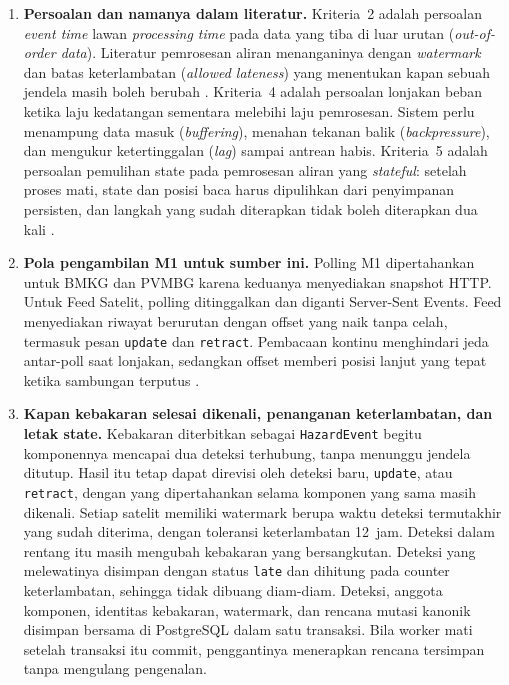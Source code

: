 \begin{enumerate}
\item \textbf{Persoalan dan namanya dalam literatur.} Kriteria~2 adalah persoalan \emph{event time} lawan \emph{processing time} pada data yang tiba di luar urutan (\emph{out-of-order data}). Literatur pemrosesan aliran menanganinya dengan \emph{watermark} dan batas keterlambatan (\emph{allowed lateness}) yang menentukan kapan sebuah jendela masih boleh berubah \cite{akidau2015}. Kriteria~4 adalah persoalan lonjakan beban ketika laju kedatangan sementara melebihi laju pemrosesan. Sistem perlu menampung data masuk (\emph{buffering}), menahan tekanan balik (\emph{backpressure}), dan mengukur ketertinggalan (\emph{lag}) sampai antrean habis. Kriteria~5 adalah persoalan pemulihan state pada pemrosesan aliran yang \emph{stateful}: setelah proses mati, state dan posisi baca harus dipulihkan dari penyimpanan persisten, dan langkah yang sudah diterapkan tidak boleh diterapkan dua kali \cite{kleppmann2017}.

\item \textbf{Pola pengambilan M1 untuk sumber ini.} Polling M1 dipertahankan untuk BMKG dan PVMBG karena keduanya menyediakan snapshot HTTP. Untuk Feed Satelit, polling ditinggalkan dan diganti Server-Sent Events. Feed menyediakan riwayat berurutan dengan offset yang naik tanpa celah, termasuk pesan \texttt{update} dan \texttt{retract}. Pembacaan kontinu menghindari jeda antar-poll saat lonjakan, sedangkan offset memberi posisi lanjut yang tepat ketika sambungan terputus \cite{sse}.

\item \textbf{Kapan kebakaran selesai dikenali, penanganan keterlambatan, dan letak state.} Kebakaran diterbitkan sebagai \texttt{HazardEvent} begitu komponennya mencapai dua deteksi terhubung, tanpa menunggu jendela ditutup. Hasil itu tetap dapat direvisi oleh deteksi baru, \texttt{update}, atau \texttt{retract}, dengan  yang dipertahankan selama komponen yang sama masih dikenali. Setiap satelit memiliki watermark berupa waktu deteksi termutakhir yang sudah diterima, dengan toleransi keterlambatan 12~jam. Deteksi dalam rentang itu masih mengubah kebakaran yang bersangkutan. Deteksi yang melewatinya disimpan dengan status \texttt{late} dan dihitung pada counter keterlambatan, sehingga tidak dibuang diam-diam. Deteksi, anggota komponen, identitas kebakaran, watermark, dan rencana mutasi kanonik disimpan bersama di PostgreSQL dalam satu transaksi. Bila worker mati setelah transaksi itu commit, penggantinya menerapkan rencana tersimpan tanpa mengulang pengenalan.


\end{enumerate}
